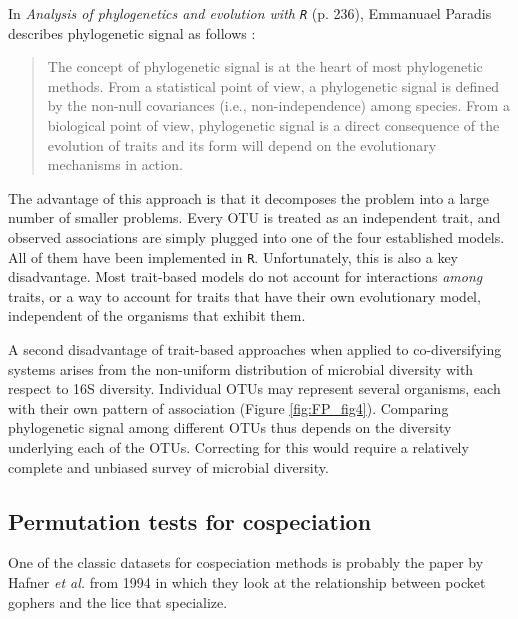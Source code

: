 In {\em Analysis of phylogenetics and evolution with {\tt R}} (p. 236), Emmanuael Paradis describes phylogenetic signal as follows :

\begin{quote}
The concept of phylogenetic signal is at the heart of most phylogenetic methods. From a statistical point of view, a phylogenetic signal is defined by the non-null covariances (i.e., non-independence) among species. From a biological point of view, phylogenetic signal is a direct consequence of the evolution of traits and its form will depend on the evolutionary mechanisms in action.
\end{quote}

The advantage of this approach is that it decomposes the problem into a large number of smaller problems. Every OTU is treated as an independent trait, and observed associations are simply plugged into one of the four established models. All of them have been implemented in {\tt R}. Unfortunately, this is also a key disadvantage. Most trait-based models do not account for interactions {\em among} traits, or a way to account for traits that have their own evolutionary model, independent of the organisms that exhibit them. 

A second disadvantage of trait-based approaches when applied to co-diversifying systems arises from the non-uniform distribution of microbial diversity with respect to 16S diversity. Individual OTUs may represent several organisms, each with their own pattern of association (Figure \ref{fig:FP_fig4}). Comparing phylogenetic signal among different OTUs thus depends on the diversity underlying each of the OTUs. Correcting for this would require a relatively complete and unbiased survey of microbial diversity.



\subsection{Permutation tests for cospeciation}

One of the classic datasets for cospeciation methods is probably the paper by 
Hafner {\em et al.} from 1994 in which they look at the relationship between pocket
gophers and the lice that specialize. 


